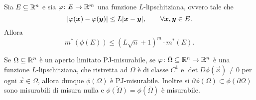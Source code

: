 \begin{lemma}
  \label{lm:misura-immagine-lipschitz}
Sia $E \subseteq {\mathbb R}^n$ e sia $\varphi\colon E \to {\mathbb R}^m$ una 
funzione $L$-lipschitziana, ovvero tale che
\[
  {\left|\varphi(\boldsymbol x) - \varphi(\boldsymbol y)\right|} \le L {\left|\boldsymbol x - \boldsymbol y\right|}, 
  \qquad \forall \boldsymbol x,\boldsymbol y \in E.
\]
Allora 
\begin{equation}\label{eq:misura-immagine-lipschitz}
   m^*(\phi(E)) \le (L\sqrt n + 1)^m \cdot m^*(E).
\end{equation}

Se $\Omega\subseteq {\mathbb R}^n$ è un aperto limitato PJ-misurabile,
se $\varphi \colon \bar \Omega\subseteq {\mathbb R}^n \to {\mathbb R}^n$ 
è una funzione $L$-lipschitziana, 
che ristretta ad $\Omega$ è di classe $C^1$ e 
$\det D\phi(\vec x)\neq 0$ per ogni $\vec x\in \Omega$,  
allora 
dunque $\phi(\Omega)$ è PJ-misurabile.
Inoltre si $\partial \phi(\Omega) \subset \phi(\partial \Omega)$
sono misurabili di misura nulla
e $\overline{\phi(\Omega)} = \phi(\bar \Omega)$ è misurabile.
\end{lemma}
%
